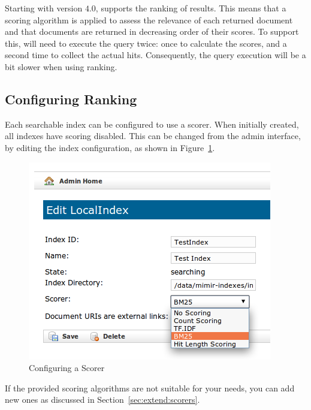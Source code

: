 Starting with version $4.0$, \Mimir{} supports the ranking of results. This
means that a scoring algorithm is applied to assess the relevance of each
returned document and that documents are returned in decreasing order of their
scores. To support this, \Mimir{} will need to execute the query twice: once to
calculate the scores, and a second time to collect the actual hits.
Consequently, the query execution will be a bit slower when using ranking.
 
\subsection{Configuring Ranking}

Each searchable index can be configured to use a scorer. When initially created,
all indexes have scoring disabled. This can be changed from the admin interface,
by editing the index configuration, as shown in Figure~\ref{fig:config-scorer}.

\begin{figure}
\begin{center}
\includegraphics[scale=0.4]{img/index-config-scorer}
\caption{Configuring a Scorer}
\label{fig:config-scorer}
\end{center}
\end{figure}

If the provided scoring algorithms are not suitable for your needs, you can add
new ones as discussed in Section~\ref{sec:extend:scorers}.